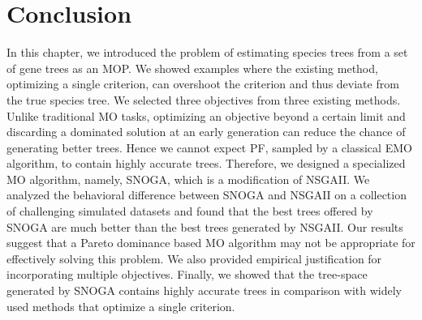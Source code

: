  \section{Conclusion} In this chapter, we introduced the problem of estimating species trees from a set of gene trees as an MOP. We showed examples where the existing method, optimizing a single criterion, can overshoot the criterion and thus deviate from the true species tree. We selected three objectives from three existing methods. Unlike traditional MO tasks, optimizing an objective beyond a certain limit and discarding a dominated solution at an early generation can reduce the chance of generating better trees. Hence we cannot expect PF, sampled by a classical EMO algorithm, to contain highly accurate trees. Therefore, we designed a specialized MO algorithm, namely, SNOGA, which is a modification of NSGAII. We analyzed the behavioral difference between SNOGA and NSGAII on a collection of challenging simulated datasets and found that the best trees offered by SNOGA are much better than the best trees generated by NSGAII. Our results suggest that a Pareto dominance based MO algorithm may not be appropriate for effectively solving this problem. We also provided empirical justification for incorporating multiple objectives. Finally, we showed that the tree-space generated by SNOGA contains highly accurate trees in comparison with widely used methods that optimize a single criterion. 





